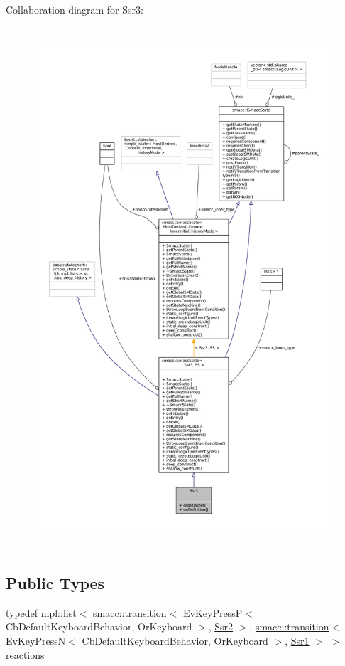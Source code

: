 Collaboration diagram for Ssr3\+:
\nopagebreak
\begin{figure}[H]
\begin{center}
\leavevmode
\includegraphics[height=550pt]{structSsr3__coll__graph}
\end{center}
\end{figure}
\subsection*{Public Types}
\begin{DoxyCompactItemize}
\item 
typedef mpl\+::list$<$ \hyperlink{classsmacc_1_1transition}{smacc\+::transition}$<$ Ev\+Key\+PressP$<$ Cb\+Default\+Keyboard\+Behavior, Or\+Keyboard $>$, \hyperlink{structSsr2}{Ssr2} $>$, \hyperlink{classsmacc_1_1transition}{smacc\+::transition}$<$ Ev\+Key\+PressN$<$ Cb\+Default\+Keyboard\+Behavior, Or\+Keyboard $>$, \hyperlink{structSsr1}{Ssr1} $>$ $>$ \hyperlink{structSsr3_a5d42cce5df84cb4f58bda69736786927}{reactions}
\end{DoxyCompactItemize}
